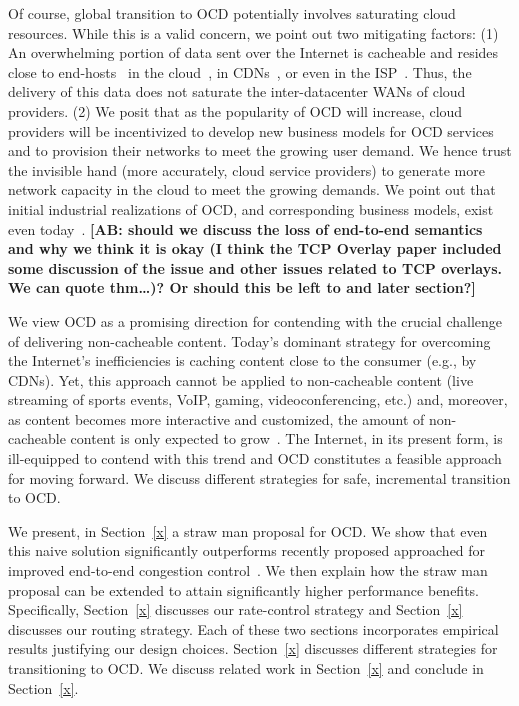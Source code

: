 \documentclass[10pt,sigconf]{acmart}
\newcommand{\mycomm}[3]{{\color{#2} \textbf{[#1: #3]}}}
\newcommand{\mycomm}[3]{}
\newcommand{\AB}[1]{\mycomm{AB}{orange}{#1}}
\begin{document}
Of course, global transition to OCD potentially involves saturating cloud resources. While this is a valid concern, we point out two mitigating factors: (1) An overwhelming portion of data sent over the Internet is cacheable and resides close to end-hosts~\cite{x,y,z} in the cloud~\cite{x,y,z}, in CDNs~\cite{x,y,z}, or even in the ISP~\cite{x,y,z}. Thus, the delivery of this data does not saturate the inter-datacenter WANs of cloud providers. (2) We posit that as the popularity of OCD will increase, cloud providers will be incentivized to develop new business models for OCD services and to provision their networks to meet the growing user demand. We hence trust the invisible hand (more accurately, cloud service providers) to generate more network capacity in the cloud to meet the growing demands. We point out that initial industrial realizations of OCD, and corresponding business models, exist even today~\cite{VMware?,teridion}.
\AB{should we discuss the loss of end-to-end semantics and why we think it is
okay (I think the TCP Overlay paper included some discussion of the issue and
other issues related to TCP overlays. We can quote thm\ldots)? Or should this be
left to and later section?}

We view OCD as a promising direction for contending with the crucial
challenge of delivering non-cacheable content. Today's dominant strategy for overcoming the Internet's inefficiencies is caching content close to the consumer (e.g., by CDNs). Yet, this approach cannot be applied to non-cacheable content (live streaming of sports events, VoIP, gaming, videoconferencing, etc.) and, moreover, as content becomes more interactive and customized, the amount of non-cacheable content is only expected to grow~\cite{x,y,z}. The Internet, in its present form, is ill-equipped to contend with this trend and OCD constitutes a feasible approach for moving forward. We discuss different strategies for safe, incremental transition to OCD.

\vspace{0.1in} We present, in Section~\ref{x} a straw man proposal for OCD. We show that even this naive solution significantly outperforms recently proposed approached for improved end-to-end congestion control~\cite{BBR, PCC}. We then explain how the straw man proposal can be extended to attain significantly higher performance benefits. Specifically, Section~\ref{x} discusses our rate-control strategy and Section~\ref{x} discusses our routing strategy. Each of these two sections incorporates empirical results justifying our design choices. Section~\ref{x} discusses different strategies for transitioning to OCD. We discuss related work in Section~\ref{x} and conclude in Section~\ref{x}.
\end{document}
